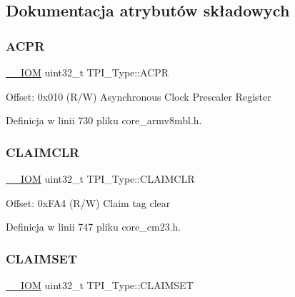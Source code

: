 \subsection{Dokumentacja atrybutów składowych}
\mbox{\label{struct_t_p_i___type_a9e5e4421ef9c3d5b7ff8b24abd4e99b3}} 
\subsubsection{\texorpdfstring{A\+C\+PR}{ACPR}}
{\footnotesize\ttfamily \hyperlink{core__sc300_8h_ab6caba5853a60a17e8e04499b52bf691}{\+\_\+\+\_\+\+I\+OM} uint32\+\_\+t T\+P\+I\+\_\+\+Type\+::\+A\+C\+PR}

Offset\+: 0x010 (R/W) Asynchronous Clock Prescaler Register 

Definicja w linii 730 pliku core\+\_\+armv8mbl.\+h.

\mbox{\label{struct_t_p_i___type_a0e10e292cb019a832b03ddd055b2f6ac}} 
\subsubsection{\texorpdfstring{C\+L\+A\+I\+M\+C\+LR}{CLAIMCLR}}
{\footnotesize\ttfamily \hyperlink{core__sc300_8h_ab6caba5853a60a17e8e04499b52bf691}{\+\_\+\+\_\+\+I\+OM} uint32\+\_\+t T\+P\+I\+\_\+\+Type\+::\+C\+L\+A\+I\+M\+C\+LR}

Offset\+: 0x\+F\+A4 (R/W) Claim tag clear 

Definicja w linii 747 pliku core\+\_\+cm23.\+h.

\mbox{\label{struct_t_p_i___type_af8b7d15fa5252b733dd4b11fa1b5730a}} 
\subsubsection{\texorpdfstring{C\+L\+A\+I\+M\+S\+ET}{CLAIMSET}}
{\footnotesize\ttfamily \hyperlink{core__sc300_8h_ab6caba5853a60a17e8e04499b52bf691}{\+\_\+\+\_\+\+I\+OM} uint32\+\_\+t T\+P\+I\+\_\+\+Type\+::\+C\+L\+A\+I\+M\+S\+ET}

